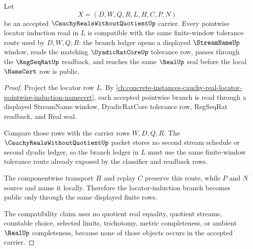 \begin{theorem}
\label{thm:cauchy-reals-without-quotient-locator-induction-compatibility}
Let
$$
X=(D,W,Q,R,L,H,C,P,N)
$$
be an accepted $\CauchyRealsWithoutQuotientUp$ carrier. Every pointwise locator induction read in $L$ is compatible with the same finite-window tolerance route used by $D,W,Q,R$: the branch ledger opens a displayed $\StreamNameUp$ window, reads the matching $\DyadicRatCoreUp$ tolerance row, passes through the $\RegSeqRatUp$ readback, and reaches the same $\RealUp$ seal before the local $\NameCert$ row is public.
\end{theorem}
\begin{proof}
Project the locator row $L$. By \autoref{ch:concrete-instances-cauchy-real-locator-pointwise-induction-namecert}, each accepted pointwise branch is read through a displayed StreamName window, DyadicRatCore tolerance row, RegSeqRat readback, and Real seal.

Compare those rows with the carrier rows $W,D,Q,R$. The $\CauchyRealsWithoutQuotientUp$ packet stores no second stream schedule or second dyadic ledger, so the branch ledger in $L$ must use the same finite-window tolerance route already exposed by the classifier and readback rows.

The componentwise transport $H$ and replay $C$ preserve this route, while $P$ and $N$ source and name it locally. Therefore the locator-induction branch becomes public only through the same displayed finite rows.

The compatibility claim uses no quotient real equality, quotient streams, countable choice, selected limits, trichotomy, metric completeness, or ambient $\RealUp$ completeness, because none of those objects occurs in the accepted carrier.
\end{proof}



